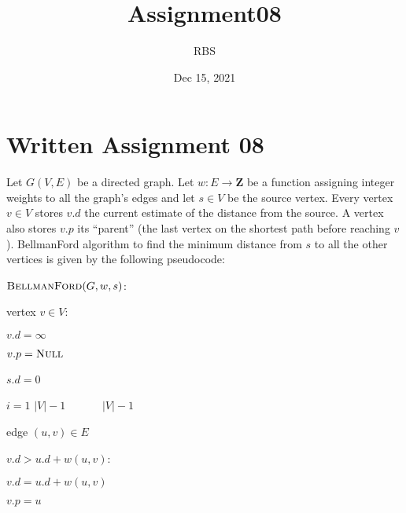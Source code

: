 \documentclass[letterpaper,10pt,english,openany,oneside]{sphinxmanual}
\title{Assignment08}
\date{Dec 15, 2021}
\author{RBS}
\begin{document}
\pagestyle{empty}

\pagestyle{plain}

\pagestyle{normal}
\label{\detokenize{index::doc}}



\chapter{Written Assignment 08}
\label{\detokenize{assignment08:written-assignment-08}}\label{\detokenize{assignment08::doc}}
\sphinxAtStartPar
Let \(G(V,E)\) be a directed graph. Let \(w:E\rightarrow{}\mathbf{Z}\)
be a function assigning integer weights to all the graph’s edges and let \(s \in V\) be
the source vertex.
Every vertex \(v \in V\) stores \(v.d\) \textendash{} the current estimate of
the distance from the source. A vertex also stores \(v.p\) \textendash{}
its “parent” (the last vertex on the shortest path before reaching \(v\)).
Bellman\sphinxhyphen{}Ford algorithm to find the minimum distance from \(s\) to all the other
vertices is given by the following pseudocode:

\begin{DUlineblock}{0em}
\item[] \(\text{\sc BellmanFord}(G,w,s)\):
\item[]
\begin{DUlineblock}{\DUlineblockindent}
\item[]   vertex \(v \in V\):      
\item[]
\begin{DUlineblock}{\DUlineblockindent}
\item[] \(v.d = \infty\)
\item[] \(v.p = \text{\sc Null}\)
\end{DUlineblock}
\item[] \(s.d = 0\)      
\item[]  \(i=1\)  \(|V|-1\)       \(|V|-1\) 
\item[]
\begin{DUlineblock}{\DUlineblockindent}
\item[]   edge \((u,v) \in E\)
\item[]
\begin{DUlineblock}{\DUlineblockindent}
\item[]  \(v.d > u.d + w(u,v)\):      
\item[]
\begin{DUlineblock}{\DUlineblockindent}
\item[] \(v.d = u.d + w(u,v)\)
\item[] \(v.p = u\)
\end{DUlineblock}
\end{DUlineblock}
\end{DUlineblock}
\end{DUlineblock}
\end{DUlineblock}
\end{document}

